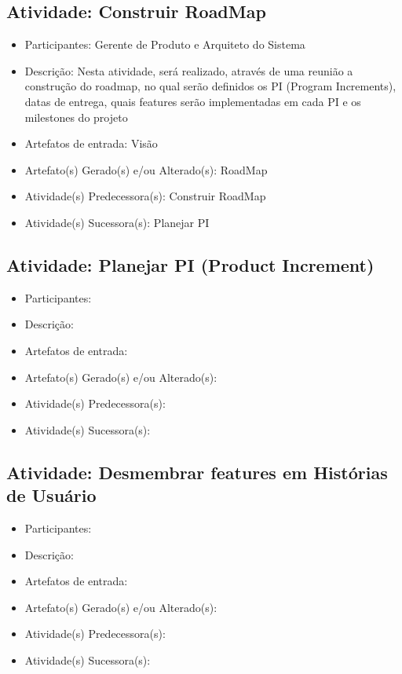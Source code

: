 \subsection{Atividade: Construir RoadMap}
\begin{itemize}
\item Participantes: Gerente de Produto e Arquiteto do Sistema

\item Descrição: Nesta atividade, será realizado, através de uma reunião
a construção do roadmap, no qual serão definidos os PI (Program Increments),
datas de entrega, quais features serão implementadas em cada PI e os milestones do projeto

\item Artefatos de entrada: Visão

\item Artefato(s) Gerado(s) e/ou Alterado(s): RoadMap

\item Atividade(s) Predecessora(s): Construir RoadMap
  
\item Atividade(s) Sucessora(s): Planejar PI
\end{itemize}

\subsection{Atividade: Planejar PI (Product Increment)}
\begin{itemize}
\item Participantes: 

\item Descrição: 

\item Artefatos de entrada: 

\item Artefato(s) Gerado(s) e/ou Alterado(s): 

\item Atividade(s) Predecessora(s): 
  
\item Atividade(s) Sucessora(s): 
\end{itemize}



\subsection{Atividade: Desmembrar features em Histórias de Usuário}
\begin{itemize}
\item Participantes: 

\item Descrição: 

\item Artefatos de entrada: 

\item Artefato(s) Gerado(s) e/ou Alterado(s): 

\item Atividade(s) Predecessora(s): 
  
\item Atividade(s) Sucessora(s): 
\end{itemize}

